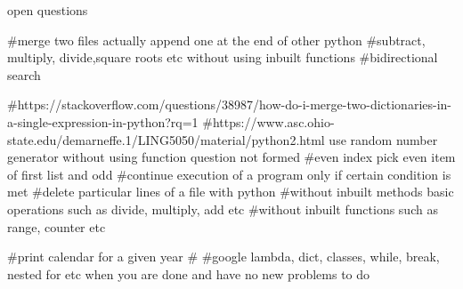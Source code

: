 open questions

#merge two files actually append one at the end of other python
#subtract, multiply, divide,square roots etc without using inbuilt functions
#bidirectional search

#https://stackoverflow.com/questions/38987/how-do-i-merge-two-dictionaries-in-a-single-expression-in-python?rq=1
#https://www.asc.ohio-state.edu/demarneffe.1/LING5050/material/python2.html
use  random number generator without using function
question not formed #even index pick even item of first list and odd 
#continue execution of a program only if certain condition is met
#delete particular lines of a file with python
#without inbuilt methods basic operations such as divide, multiply, add etc
#without inbuilt functions such as range, counter etc

#print calendar for a given year 
#
#google lambda, dict, classes, while, break, nested for etc  when you are done and have no new problems to do



